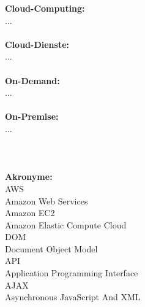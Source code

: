 

\textbf{Cloud-Computing:}\\
...
\\\\
\textbf{Cloud-Dienste:}\\
...
\\\\
\textbf{On-Demand:}\\
...
\\\\
\textbf{On-Premise:}\\
...
\\\\
\\\\
\textbf{Akronyme:}\\
{AWS}\\{Amazon Web Services}\\
{Amazon EC2}\\{Amazon Elastic Compute Cloud }\\
{DOM}\\{Document Object Model}\\
{API}\\{Application Programming Interface}\\
{AJAX}\\{Asynchronous JavaScript And XML}\\

